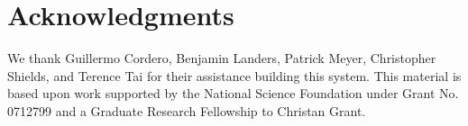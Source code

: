 \documentclass{sig-alternate}
\begin{document}



















\section{Acknowledgments}

We thank Guillermo Cordero, Benjamin Landers, Patrick Meyer, Christopher Shields, and Terence Tai for their assistance building this system. This material is based upon work supported by the National Science Foundation under Grant No. 0712799 and a Graduate Research Fellowship to Christan Grant.


  
\end{document}
